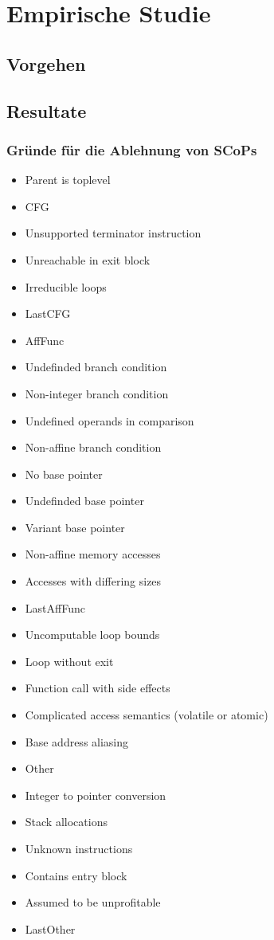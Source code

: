 \chapter{Empirische Studie}
\section{Vorgehen}

\section{Resultate}
\subsection{Gründe für die Ablehnung von SCoPs}
\begin{itemize}
    \item Parent is toplevel
        
    \item CFG
    \item Unsupported terminator instruction
    \item Unreachable in exit block
    \item Irreducible loops
    \item LastCFG
    \item AffFunc
    \item Undefinded branch condition
    \item Non-integer branch condition
    \item Undefined operands in comparison
    \item Non-affine branch condition
    \item No base pointer
    \item Undefinded base pointer
    \item Variant base pointer
    \item Non-affine memory accesses
    \item Accesses with differing sizes
    \item LastAffFunc
    \item Uncomputable loop bounds
    \item Loop without exit
        
    \item Function call with side effects
    \item Complicated access semantics (volatile or atomic)
    \item Base address aliasing
    \item Other
    \item Integer to pointer conversion
        
    \item Stack allocations
    \item Unknown instructions
    \item Contains entry block
    \item Assumed to be unprofitable
    \item LastOther
\end{itemize}

